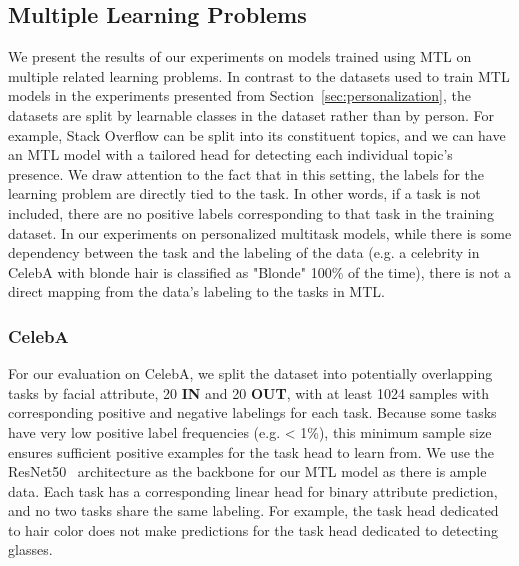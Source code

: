

\subsection{Multiple Learning Problems} \label{sec:multiple_obj}

We present the results of our experiments on models trained using MTL on multiple related learning problems. In contrast to the datasets used to train MTL models in the experiments presented from Section~\ref{sec:personalization}, the datasets are split by learnable classes in the dataset rather than by person. For example, Stack Overflow can be split into its constituent topics, and we can have an MTL model with a tailored head for detecting each individual topic's presence. We draw attention to the fact that in this setting, the labels for the learning problem are directly tied to the task. In other words, if a task is not included, there are no positive labels corresponding to that task in the training dataset. In our experiments on personalized multitask models, while there is some dependency between the task and the labeling of the data (e.g. a celebrity in CelebA with blonde hair is classified as "Blonde" 100\% of the time), there is not a direct mapping from the data's labeling to the tasks in MTL. 


\subsubsection{CelebA} \label{sec:celeba_task_level}

For our evaluation on CelebA, we split the dataset into potentially overlapping tasks by facial attribute, 20 \textbf{IN} and 20 \textbf{OUT}, with at least 1024 samples with corresponding positive and negative labelings for each task. Because some tasks have very low positive label frequencies (e.g. < 1\%), this minimum sample size ensures sufficient positive examples for the task head to learn from. We use the ResNet50~\cite{ResNet} architecture as the backbone for our MTL model as there is ample data. Each task has a corresponding linear head for binary attribute prediction, and no two tasks share the same labeling. For example, the task head dedicated to hair color does not make predictions for the task head dedicated to detecting glasses. 

